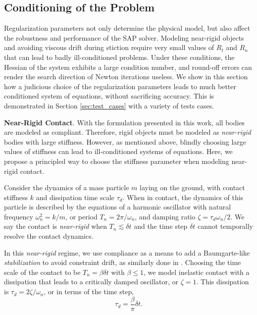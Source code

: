 \subsection{Conditioning of the Problem}
\label{sec:understanding_model_parameters}

Regularization parameters not only determine the physical model, but also affect
the robustness and performance of the SAP solver. Modeling near-rigid objects
and avoiding viscous drift during stiction require very small values of $R_t$
and $R_n$ that can lead to badly ill-conditioned problems. Under these
conditions, the Hessian of the system exhibits a large condition number, and
round-off errors can render the search direction of Newton iterations useless.
We show in this section how a judicious choice of the regularization parameters
leads to much better conditioned system of equations, without sacrificing
accuracy. This is demonstrated in Section \ref{sec:test_cases} with a variety of
tests cases.

\textbf{Near-Rigid Contact}. With the formulation presented in this work, all
bodies are modeled as compliant. Therefore, rigid objects must be modeled as
\emph{near-rigid} bodies with large stiffness. However, as mentioned above,
blindly choosing large values of stiffness can lead to ill-conditioned systems
of equations. Here, we propose a principled way to choose the stiffness
parameter when modeling near-rigid contact.

Consider the dynamics of a mass particle $m$ laying on the ground, with contact
stiffness $k$ and dissipation time scale $\tau_d$. When in contact, the dynamics
of this particle is described by the equations of a harmonic oscillator with
natural frequency $\omega_n^2 = k/m$, or period $T_n = 2\pi/\omega_n$, and
damping ratio $\zeta=\tau_d\omega_n/2$. We say the contact is \emph{near-rigid}
when $T_n \lesssim \delta t$ and the time step $\delta t$ cannot temporally
resolve the contact dynamics. 

In this \emph{near-rigid} regime, we use compliance as a means to add a
Baumgarte-like \emph{stabilization} to avoid constraint drift, as similarly done
in \cite{bib:todorov2011}. Choosing the time scale of the contact to be $T_n =
\beta \delta t$ with $\beta \le 1$, we model inelastic contact with a
dissipation that leads to a critically damped oscillator, or $\zeta=1$. This
dissipation is $\tau_d=2\zeta/\omega_n$, or in terms of the time step,
\begin{equation*}
    \tau_d=\frac{\beta}{\pi}\delta t.
\end{equation*}

